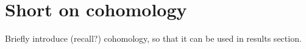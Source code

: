 \section{Short on cohomology}

Briefly introduce (recall?) cohomology, so that it can be used in results section. 